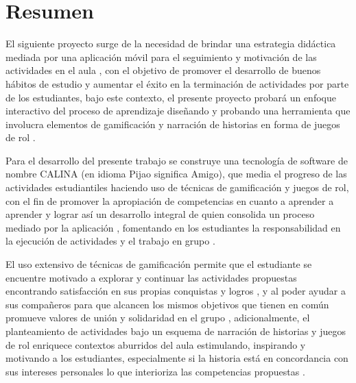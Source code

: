 \section*{Resumen}

\begin{singlespace}
El siguiente proyecto surge de la necesidad de brindar una estrategia didáctica mediada por una aplicación 
móvil para el seguimiento y motivación de las actividades en el aula \cite{SAILER2017371, DAROCHASEIXAS201648}, 
con el objetivo de promover el desarrollo de buenos hábitos de estudio y aumentar el éxito en la terminación 
de actividades por parte de los estudiantes, bajo este contexto, el presente proyecto probará un enfoque 
interactivo del proceso de aprendizaje diseñando y probando una herramienta que involucra elementos de 
gamificación y narración de historias en forma de juegos de rol \cite{rauscher2021comics}.

Para el desarrollo del presente trabajo se construye una tecnología de software de nombre CALINA (en idioma 
Pijao significa Amigo), que media el progreso de las actividades estudiantiles haciendo uso de técnicas de 
gamificación y juegos de rol, con el fin de promover la apropiación de competencias en cuanto a aprender a 
aprender y lograr así un desarrollo integral de quien consolida un proceso mediado por la aplicación 
\cite{tornero2016ideas, molina_reconfiguracion_2021}, fomentando en los estudiantes la responsabilidad en la 
ejecución de actividades y el trabajo en grupo \cite{XU2017}.

El uso extensivo de técnicas de gamificación permite que el estudiante se encuentre motivado a explorar y 
continuar las actividades propuestas encontrando satisfacción en sus propias conquistas y logros 
\cite{Danka2020, MULLINS2020304}, y al poder ayudar a sus compañeros para que alcancen los mismos objetivos 
que tienen en común promueve valores de unión y solidaridad en el grupo \cite{DING20191}, adicionalmente, el 
planteamiento de actividades bajo un esquema de narración de historias y juegos de rol enriquece contextos 
aburridos del aula estimulando, inspirando y motivando a los estudiantes, especialmente si la historia está en 
concordancia con sus intereses personales lo que interioriza las competencias propuestas 
\cite{8190501, Young2015199}. 


\end{singlespace}
